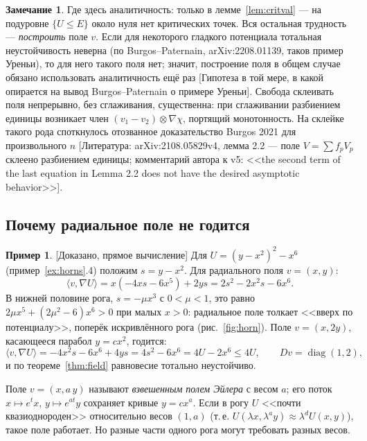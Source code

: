 \documentclass[11pt,a4paper]{article}
\theoremstyle{definition}
\newtheorem{example}[theorem]{Пример}
\newtheorem{remark}[theorem]{Замечание}
\newcommand{\mk}[1]{\textsf{[#1]}}
\newcommand{\term}[1]{\emph{#1}}
\begin{document}
\begin{remark}\label{rem:where-analytic}
Где здесь аналитичность: только в лемме~\ref{lem:critval} --- на подуровне $\{U\le E\}$ около
нуля нет критических точек. Вся остальная трудность --- \emph{построить} поле $v$. Если для
некоторого гладкого потенциала тотальная неустойчивость неверна (по Burgos--Paternain,
arXiv:2208.01139, таков пример Уреньи), то для него такого поля нет; значит, построение поля в
общем случае обязано использовать аналитичность ещё раз \mk{Гипотеза в той мере, в какой
опирается на вывод Burgos--Paternain о примере Уреньи}. Свобода склеивать поля непрерывно, без сглаживания,
существенна: при сглаживании разбиением единицы возникает член $(v_1-v_2)\otimes\nabla\chi$,
портящий монотонность. На склейке такого рода споткнулось отозванное доказательство Burgos 2021
для произвольного $n$ \mk{Литература: arXiv:2108.05829v4, лемма 2.2 --- поле $V=\sum f_pV_p$
склеено разбиением единицы; комментарий автора к v5: <<the second term of the last equation in
Lemma 2.2 does not have the desired asymptotic behavior>>}.
\end{remark}

\subsection{Почему радиальное поле не годится}

\begin{example}\label{ex:radial-fails}
\mk{Доказано, прямое вычисление} Для $U=(y-x^2)^2-x^6$ (пример~\ref{ex:horns}.4) положим
$s=y-x^2$. Для радиального поля $v=(x,y)$:
\[
\langle v,\nabla U\rangle=x(-4xs-6x^5)+2ys=2s^2-2x^2s-6x^6 .
\]
В нижней половине рога, $s=-\mu x^3$ с $0<\mu<1$, это равно $2\mu x^5+(2\mu^2-6)x^6>0$ при малых
$x>0$: радиальное поле толкает <<вверх по потенциалу>>, поперёк искривлённого рога
(рис.~\ref{fig:horn}). Поле $v=(x,2y)$, касающееся парабол $y=cx^2$, годится:
\[
\langle v,\nabla U\rangle=-4x^2s-6x^6+4ys=4s^2-6x^6=4U-2x^6\le4U,\qquad Dv=\operatorname{diag}(1,2),
\]
и по теореме~\ref{thm:field} равновесие тотально неустойчиво.
\end{example}

Поле $v=(x,a\,y)$ называют \term{взвешенным полем Эйлера} с весом $a$; его поток
$x\mapsto e^tx$, $y\mapsto e^{at}y$ сохраняет кривые $y=cx^a$. Если в рогу $U$ <<почти
квазиоднороден>> относительно весов $(1,a)$ (т.\,е. $U(\lambda x,\lambda^ay)\approx\lambda^dU(x,y)$),
такое поле работает. Но разные части одного рога могут требовать разных весов.
\end{document}
